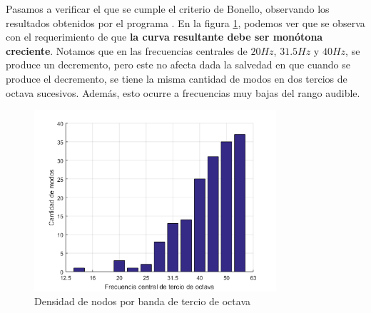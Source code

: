 \par Pasamos a verificar el que se cumple el criterio de Bonello, observando los resultados obtenidos por el programa . En la figura \ref{fig:modos_resonancia}, podemos ver que se observa con el requerimiento de que \textbf{la curva resultante debe ser monótona creciente}. Notamos que en las frecuencias centrales de $20Hz$, $31.5Hz$ y $40Hz$, se produce un decremento, pero este no afecta dada la salvedad en que cuando se produce el decremento, se tiene la misma cantidad de modos en dos tercios de octava sucesivos. Además, esto ocurre a frecuencias muy bajas del rango audible.


\begin{figure}[H]
	\centering
	\includegraphics[width=0.8\textwidth]{./img/modos_resonancia.png}
	\caption{Densidad de nodos por banda de tercio de octava}
	\label{fig:modos_resonancia}
\end{figure}

\newpage

